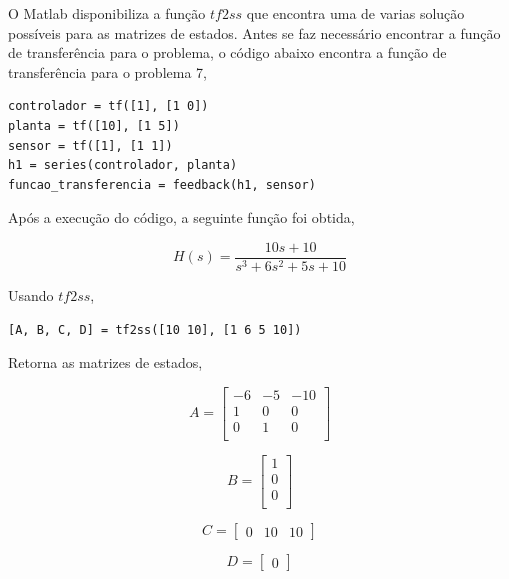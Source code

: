 \documentclass[a4paper, 10pt]{article}
\begin{document}
\begin{list}{\textbf{Questão .}}{
\setlength{\labelwidth}{-2mm} \setlength{\parsep}{0mm}
\setlength{\topsep}{0mm} \setlength{\leftmargin}{0mm}}
            O Matlab disponibiliza a função $tf2ss$ que encontra uma de varias 
            solução possíveis para as matrizes de estados. Antes se faz
            necessário encontrar a função de transferência para o problema, 
            o código abaixo encontra a função de transferência para o problema 7,

            \begin{lstlisting}
controlador = tf([1], [1 0])
planta = tf([10], [1 5])
sensor = tf([1], [1 1])
h1 = series(controlador, planta)
funcao_transferencia = feedback(h1, sensor)
                \end{lstlisting}

            Após a execução do código, a seguinte função foi obtida,

            $$
            H(s) = \frac{10 s + 10}{s^3 + 6 s^2 + 5 s + 10}
            $$

            Usando $tf2ss$, 

            \begin{lstlisting}
[A, B, C, D] = tf2ss([10 10], [1 6 5 10])
            \end{lstlisting}

            Retorna as matrizes de estados,

            $$
            A = \left[\begin{array}{rrr}
                    -6 & -5 & -10 \\
                    1 & 0 & 0 \\
                    0 & 1 & 0 \\
            \end{array}\right]
            $$

            $$
            B = \left[\begin{array}{r}
                1 \\
                0 \\
                0 \\
            \end{array}\right]
            $$

            $$
            C = \left[\begin{array}{rrr}
                0 & 10 & 10
               \end{array}\right]
            $$

            $$
            D = \left[\begin{array}{r}
                0 
               \end{array}\right]
            $$



\end{list}
\end{document}
